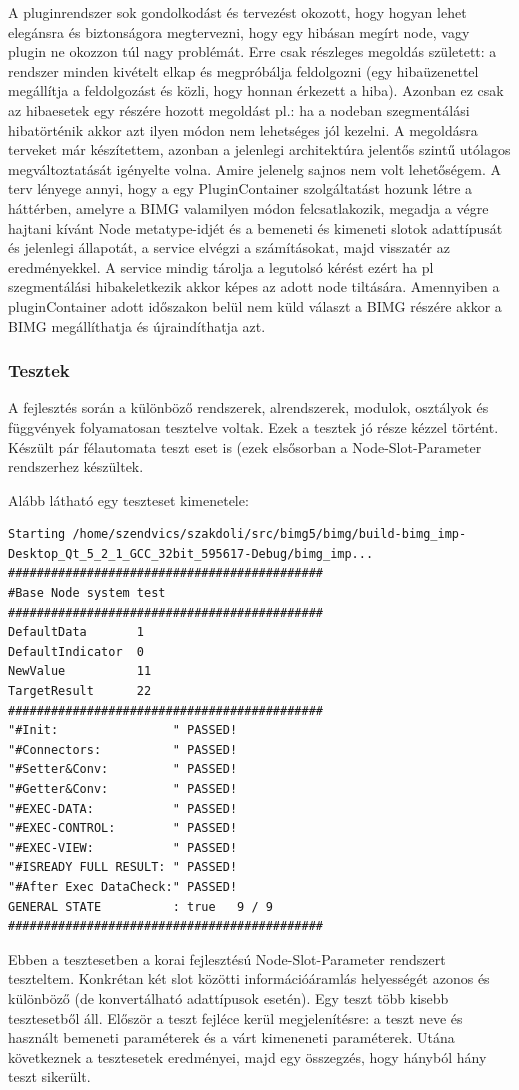 \documentclass[a4paper,12pt,oneside]{report}
\begin{document}
A pluginrendszer sok gondolkodást és tervezést okozott, hogy hogyan lehet elegánsra és biztonságora megtervezni, hogy egy hibásan megírt node, vagy plugin ne okozzon túl nagy problémát. Erre csak részleges megoldás született: a rendszer minden kivételt elkap és megpróbálja feldolgozni (egy hibaüzenettel megállítja a feldolgozást és közli, hogy honnan érkezett a hiba). Azonban ez csak az hibaesetek egy részére hozott megoldást pl.: ha a nodeban szegmentálási hibatörténik akkor azt ilyen módon nem lehetséges jól kezelni. A megoldásra terveket már készítettem, azonban a jelenlegi architektúra jelentős szintű utólagos megváltoztatását igényelte volna. Amire jelenelg sajnos nem volt lehetőségem. A terv lényege annyi, hogy a egy PluginContainer szolgáltatást hozunk létre a háttérben, amelyre a BIMG valamilyen módon felcsatlakozik, megadja a végre hajtani kívánt Node metatype-idjét és a bemeneti és kimeneti slotok adattípusát és jelenlegi állapotát, a service elvégzi a számításokat, majd visszatér az eredményekkel. A service mindig tárolja a legutolsó kérést ezért ha pl szegmentálási hibakeletkezik akkor képes az adott node tiltására. Amennyiben a pluginContainer adott időszakon belül nem küld választ a BIMG részére akkor a BIMG megállíthatja és újraindíthatja azt.

\subsubsection{Tesztek}
A fejlesztés során a különböző rendszerek, alrendszerek, modulok, osztályok és függvények folyamatosan tesztelve voltak. Ezek a tesztek jó része kézzel történt. Készült pár félautomata teszt eset is (ezek elsősorban a Node-Slot-Parameter rendszerhez készültek.

Alább látható egy teszteset kimenetele:
\begin{lstlisting}
Starting /home/szendvics/szakdoli/src/bimg5/bimg/build-bimg_imp-Desktop_Qt_5_2_1_GCC_32bit_595617-Debug/bimg_imp...
############################################
#Base Node system test
############################################
DefaultData       1
DefaultIndicator  0
NewValue          11
TargetResult      22
############################################
"#Init:                " PASSED!
"#Connectors:          " PASSED!
"#Setter&Conv:         " PASSED!
"#Getter&Conv:         " PASSED!
"#EXEC-DATA:           " PASSED!
"#EXEC-CONTROL:        " PASSED!
"#EXEC-VIEW:           " PASSED!
"#ISREADY FULL RESULT: " PASSED!
"#After Exec DataCheck:" PASSED!
GENERAL STATE          : true   9 / 9
############################################
\end{lstlisting}
Ebben a tesztesetben a korai fejlesztésú Node-Slot-Parameter rendszert teszteltem. Konkrétan két slot közötti információáramlás helyességét azonos és különböző (de konvertálható adattípusok esetén). Egy teszt több kisebb tesztesetből áll. Először a teszt fejléce kerül megjelenítésre: a teszt neve és használt bemeneti paraméterek és a várt kimeneneti paraméterek. Utána következnek a tesztesetek eredményei, majd egy összegzés, hogy hányból hány teszt sikerült. 
\end{document}
